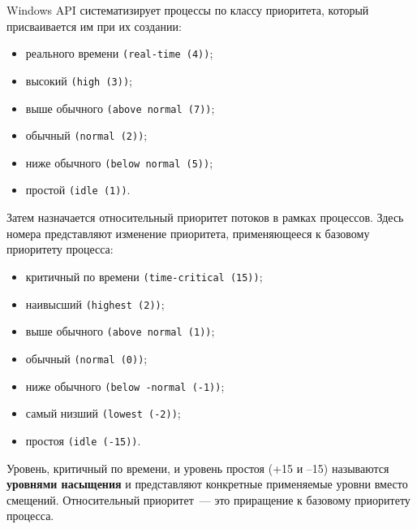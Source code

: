 Windows API систематизирует процессы по классу приоритета, который присваивается им при их создании:
\begin{itemize}
	\item реального времени \texttt{(real-time (4))};
	\item высокий \texttt{(high (3))};
	\item выше обычного \texttt{(above normal (7))};
	\item обычный \texttt{(normal (2))};
	\item ниже обычного \texttt{(below normal (5))};
	\item простой \texttt{(idle (1))}.
\end{itemize}

Затем назначается относительный приоритет потоков в рамках процессов. 
Здесь номера представляют изменение приоритета, применяющееся к базовому приоритету процесса:
\begin{itemize}
	\item критичный по времени \texttt{(time-critical (15))};
	\item наивысший \texttt{(highest (2))};
	\item выше обычного \texttt{(above normal (1))};
	\item обычный \texttt{(normal (0))};
	\item ниже обычного \texttt{(below -normal (-1))};
	\item самый низший \texttt{(lowest (-2))};
	\item простоя \texttt{(idle (-15))}.
\end{itemize}

Уровень, критичный по времени, и уровень простоя (+15 и –15) называются \textbf{уровнями насыщения} и представляют конкретные применяемые уровни вместо смещений. Относительный приоритет~--- это приращение к базовому приоритету процесса.


